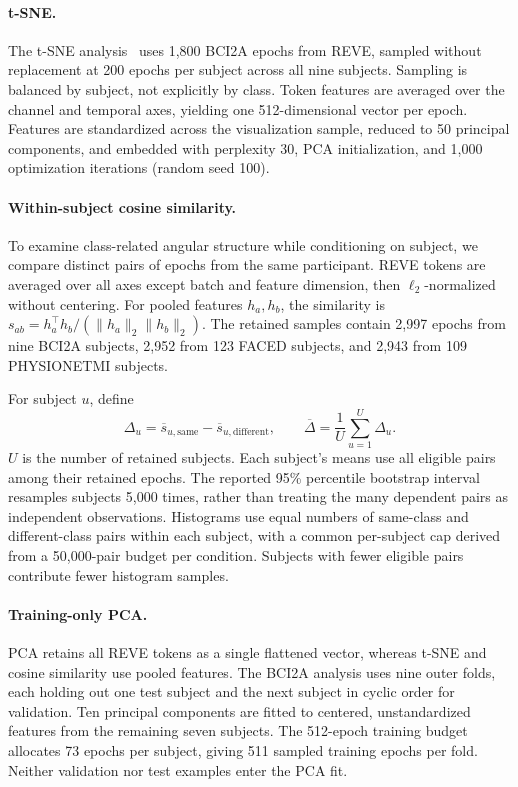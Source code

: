 \documentclass{article}
\begin{document}
\paragraph{t-SNE.}
The t-SNE analysis~\cite{vandermaaten2008tsne} uses 1,800 BCI2A epochs from
REVE, sampled without replacement at 200 epochs per subject across all nine
subjects. Sampling is balanced by subject, not explicitly by class. Token
features are averaged over the channel and temporal axes, yielding one
512-dimensional vector per epoch. Features are standardized across the
visualization sample, reduced to 50 principal components, and embedded
with perplexity 30, PCA initialization, and 1,000 optimization iterations
(random seed 100).

\paragraph{Within-subject cosine similarity.}
To examine class-related angular structure while conditioning on subject,
we compare distinct pairs of epochs from the same participant. REVE tokens
are averaged over all axes except batch and feature dimension, then
$\ell_2$-normalized without centering. For pooled features $h_a,h_b$, the
similarity is $s_{ab}=h_a^\top h_b/(\|h_a\|_2\|h_b\|_2)$. The retained
samples contain 2,997 epochs from nine BCI2A subjects, 2,952 from 123 FACED
subjects, and 2,943 from 109 PHYSIONETMI subjects.

For subject $u$, define
\begin{equation}
    \Delta_u=\overline{s}_{u,\mathrm{same}}
             -\overline{s}_{u,\mathrm{different}},
    \qquad \overline{\Delta}=\frac{1}{U}\sum_{u=1}^{U}\Delta_u.
    \label{eq:cosine-gap}
\end{equation}
$U$ is the number of retained subjects. Each subject's means use all
eligible pairs among their retained epochs.
The reported 95\% percentile bootstrap interval resamples subjects
5,000 times, rather than treating the many dependent pairs as independent
observations. Histograms use equal numbers of same-class and different-class
pairs within each subject, with a common per-subject cap derived from a
50,000-pair budget per condition. Subjects with fewer eligible pairs
contribute fewer histogram samples.

\paragraph{Training-only PCA.}
PCA retains all REVE tokens as a single flattened vector, whereas t-SNE
and cosine similarity use pooled features. The BCI2A analysis uses nine outer folds, each holding
out one test subject and the next subject in cyclic order for validation.
Ten principal components are fitted to centered, unstandardized features
from the remaining seven subjects. The 512-epoch training budget allocates
73 epochs per subject, giving 511 sampled training epochs per fold.
Neither validation nor test examples enter the PCA fit.
\end{document}
